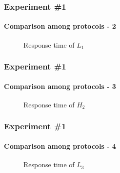 
\begin{frame}

	\frametitle{Experiment \#1}
	\framesubtitle{Comparison among protocols - 2}

	\begin{figure}
	  \centering
	  \scalebox{0.7}{\confrontoProtocolliLUno}
	  \caption{Response time of $L_1$}
	  \label{fig:test_protocols_L3}
	\end{figure}

\end{frame}

\begin{frame}

	\frametitle{Experiment \#1}
	\framesubtitle{Comparison among protocols - 3}

	\begin{figure}
	  \centering
	  \scalebox{0.7}{\confrontoProtocolliHDue}
	  \caption{Response time of $H_2$}
	  \label{fig:test_protocols_L3}
	\end{figure}

\end{frame}

\begin{frame}

	\frametitle{Experiment \#1}
	\framesubtitle{Comparison among protocols - 4}

	\begin{figure}
	  \centering
	  \scalebox{0.7}{\confrontoProtocolliLTre}
	  \caption{Response time of $L_3$}
	  \label{fig:test_protocols_L3}
	\end{figure}

\end{frame}




